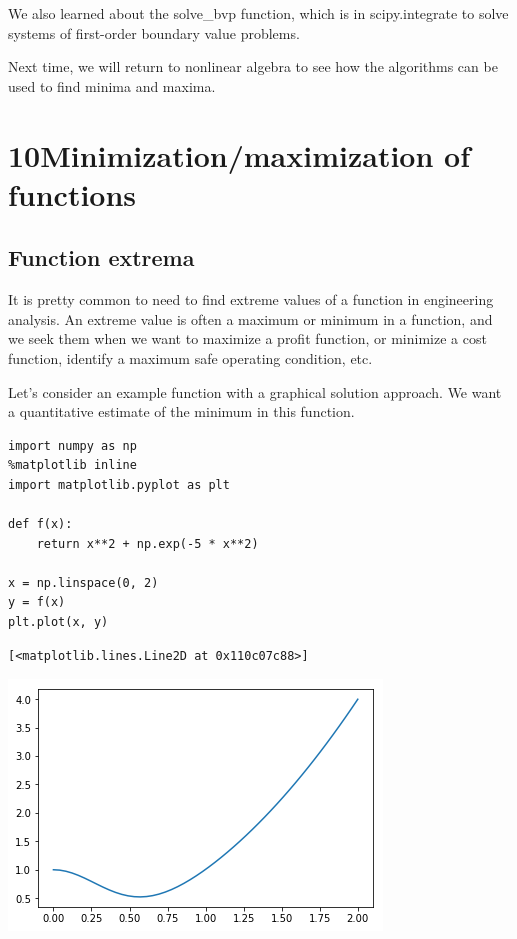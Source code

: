 \documentclass[11pt]{article}
\begin{document}
We also learned about the solve\_bvp function, which is in scipy.integrate to solve systems of first-order boundary value problems.

Next time, we will return to nonlinear algebra to see how the algorithms can be used to find minima and maxima.
\section{10Minimization/maximization of functions}
\label{sec:org261ab4a}

\subsection{Function extrema}
\label{sec:org069abc3}

It is pretty common to need to find extreme values of a function in engineering analysis. An extreme value is often a maximum or minimum in a function, and we seek them when we want to maximize a profit function, or minimize a cost function, identify a maximum safe operating condition, etc.

Let's consider an example function with a graphical solution approach. We want a quantitative estimate of the minimum in this function.

\begin{verbatim}
import numpy as np
%matplotlib inline
import matplotlib.pyplot as plt

def f(x):
    return x**2 + np.exp(-5 * x**2)

x = np.linspace(0, 2)
y = f(x)
plt.plot(x, y)
\end{verbatim}

\begin{verbatim}
[<matplotlib.lines.Line2D at 0x110c07c88>]
\end{verbatim}



\begin{center}
\includegraphics[width=.9\linewidth]{obipy-resources/baab0982fed766ced9ac305dd57e067d-90490fZG.png}
\end{center}
\end{document}
